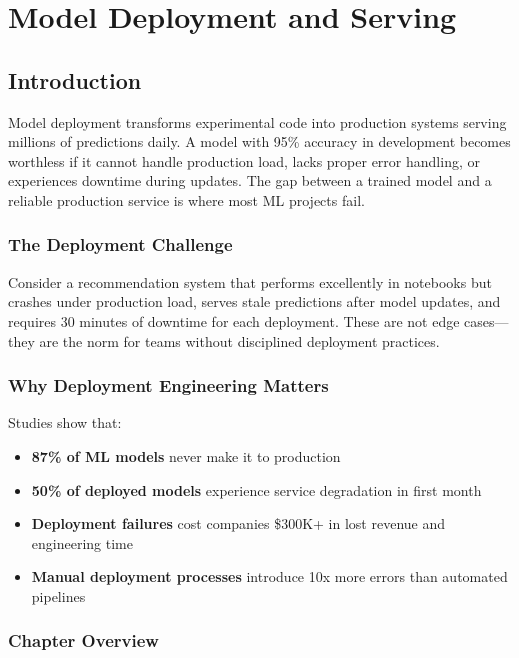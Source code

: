 \chapter{Model Deployment and Serving}

\section{Introduction}

Model deployment transforms experimental code into production systems serving millions of predictions daily. A model with 95\% accuracy in development becomes worthless if it cannot handle production load, lacks proper error handling, or experiences downtime during updates. The gap between a trained model and a reliable production service is where most ML projects fail.

\subsection{The Deployment Challenge}

Consider a recommendation system that performs excellently in notebooks but crashes under production load, serves stale predictions after model updates, and requires 30 minutes of downtime for each deployment. These are not edge cases---they are the norm for teams without disciplined deployment practices.

\subsection{Why Deployment Engineering Matters}

Studies show that:
\begin{itemize}
    \item \textbf{87\% of ML models} never make it to production
    \item \textbf{50\% of deployed models} experience service degradation in first month
    \item \textbf{Deployment failures} cost companies \$300K+ in lost revenue and engineering time
    \item \textbf{Manual deployment processes} introduce 10x more errors than automated pipelines
\end{itemize}

\subsection{Chapter Overview}

